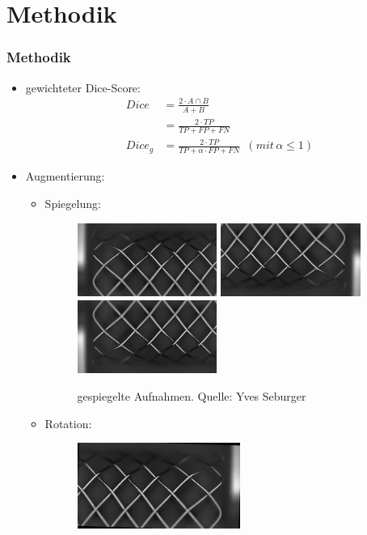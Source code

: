 \documentclass{beamer}
\begin{document}
\section{Methodik}
\begin{frame}[allowframebreaks]
\frametitle{Methodik}
\begin{itemize}
    \item gewichteter Dice-Score:\\
    \begin{equation}
        \begin{split}
            Dice &= \frac{2 \cdot A \cap B}{A + B}\\
            &= \frac{2 \cdot TP}{TP + FP + FN}\\
            Dice_g &= \frac{2 \cdot TP}{TP + \alpha \cdot FP + FN}
            \,\,\,(mit\, \alpha \leq 1)
        \end{split}
    \end{equation}
    \framebreak
    \item Augmentierung:
    \begin{itemize}
        \item Spiegelung:
        \begin{figure}
            \includegraphics[height=2.4cm]{Bilder/Augmentation/mlr.jpg}
            \includegraphics[height=2.4cm]{Bilder/Augmentation/mtb.jpg}
            \includegraphics[height=2.4cm]{Bilder/Augmentation/mtlr.jpg}
            \caption{gespiegelte Aufnahmen. \scriptsize{Quelle: Yves Seburger}}
        \end{figure} 
        \item Rotation:
        \begin{figure}
            \includegraphics[height=2.8cm]{Bilder/Augmentation/-2grad.jpg}

\end{figure}
\end{itemize}
\end{itemize}
\end{frame}
\end{document}
